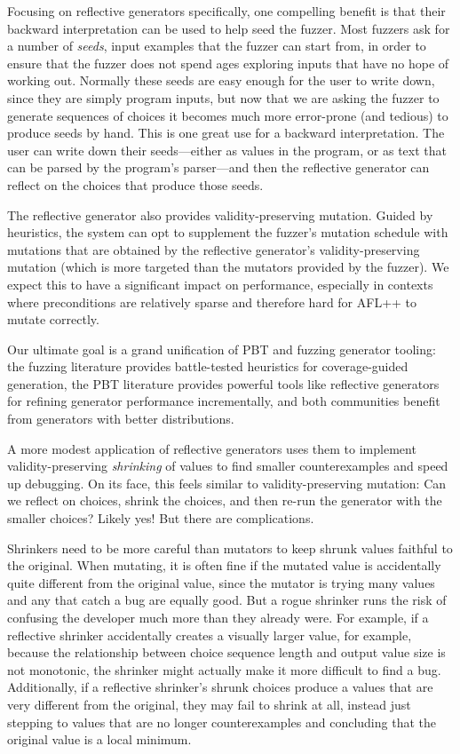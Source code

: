Focusing on reflective generators specifically, one compelling benefit is that
their backward interpretation can be used to help seed the fuzzer.  Most fuzzers
ask for a number of {\em seeds}, input examples that the fuzzer can start from,
in order to ensure that the fuzzer does not spend ages exploring
inputs that have no hope of working out. Normally these seeds are easy enough
for the user to write down, since they are simply program inputs, but now that
we are asking the fuzzer to generate sequences of choices it becomes much more
error-prone (and tedious) to produce seeds by hand.  This is one great use for a
backward interpretation. The user can write down their seeds---either as values
in the program, or as text that can be parsed by the program's parser---and then
the reflective generator can reflect on the choices that produce those seeds.

The reflective generator also provides validity-preserving mutation. Guided by
heuristics, the system can opt to supplement the fuzzer's mutation schedule with
mutations that are obtained by the reflective generator's validity-preserving
mutation (which is more targeted than the mutators provided by the fuzzer). We
expect this to have a significant impact on performance, especially in contexts
where preconditions are relatively sparse and therefore hard for AFL++ to mutate
correctly.

Our ultimate goal is a grand unification of PBT and fuzzing generator tooling:
the fuzzing literature provides battle-tested heuristics for coverage-guided
generation, the PBT literature provides powerful tools like reflective
generators for refining generator performance incrementally, and both
communities benefit from generators with better distributions.

%
A more modest application of reflective generators uses them to implement
validity-preserving {\em shrinking} of values to find smaller counterexamples
and speed up debugging. On its face, this feels similar to validity-preserving
mutation: Can we reflect on choices, shrink the choices, and then re-run the
generator with the smaller choices? Likely yes! But there are complications.

Shrinkers need to be more careful than mutators to keep shrunk values faithful
to the original. When mutating, it is often fine if the mutated value is
accidentally quite different from the original value, since the mutator is
trying many values and any that catch a bug are equally good. But a rogue
shrinker runs the risk of confusing the developer much more than they already
were. For example, if a reflective shrinker accidentally creates a visually larger
value, for example, because the relationship between choice sequence length and
output value size is not monotonic, the shrinker might actually make it more
difficult to find a bug. Additionally, if a reflective shrinker's shrunk choices
produce a values that are very different from the original, they may fail to
shrink at all, instead just stepping to values that are no longer
counterexamples and concluding that the original value is a local minimum.

